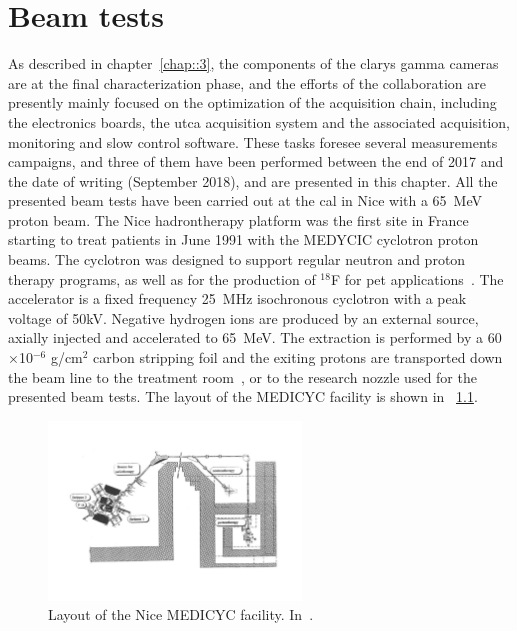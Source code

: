 \chapter{Beam tests}\label{chap::6}

\vfill

\minitoc

\newpage

\glsresetall
{} 


As described in chapter~\ref{chap::3}, the components of the \gls{clarys} gamma cameras are at the final characterization phase, and the efforts of the collaboration are presently mainly focused on the optimization of the acquisition chain, including the electronics boards, the \gls{utca} acquisition system and the associated acquisition, monitoring and slow control software. These tasks foresee several measurements campaigns, and three of them have been performed between the end of 2017 and the date of writing (September 2018), and are presented in this chapter. 
All the presented beam tests have been carried out at the \gls{cal} in Nice with a 65~MeV proton beam. The Nice hadrontherapy platform was the first site in France starting to treat patients in June 1991 with the MEDYCIC cyclotron proton beams. The cyclotron was designed to support regular neutron and proton therapy programs, as well as for the production of $^{18}$F for \gls{pet} applications~\parencite{Mandrillon1989, Mandrillon1992}. The accelerator is a fixed frequency 25~MHz isochronous cyclotron with a peak voltage of 50kV. Negative hydrogen ions are produced by an external source, axially injected and accelerated to 65~MeV. The extraction is performed by a 60$\times$10$^{-6}$ g/cm$^2$ carbon stripping foil and the exiting protons are transported down the beam line to the treatment room~\parencite{Herault2005}, or to the research nozzle used for the presented beam tests. The layout of the MEDICYC facility is shown in \figurename~\ref{chap6::fig::MEDICYC_layout}.

 \begin{figure}[!htbp]
\centering
\includegraphics[width=0.6\textwidth]{03_GraphicFiles/chapter6_BeamTests/MEDiCYC.pdf}
\caption{Layout of the Nice MEDICYC facility. In~\cite{Mandrillon1992}.}
\label{chap6::fig::MEDICYC_layout}
\end{figure}



